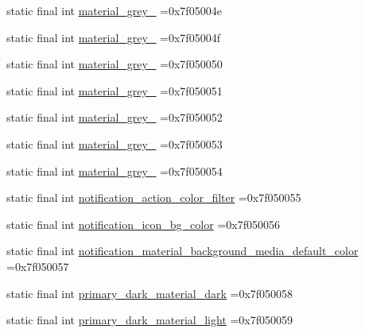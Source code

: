 \begin{DoxyCompactItemize}
\item 
static final int \mbox{\hyperlink{classcom_1_1example_1_1trainawearapplication_1_1_r_1_1color_a6abde947d2c6d3035e498238a10357be}{material\+\_\+grey\+\_}} =0x7f05004e
\item 
static final int \mbox{\hyperlink{classcom_1_1example_1_1trainawearapplication_1_1_r_1_1color_aecbc9b09aff1e2326ca650555af5d29b}{material\+\_\+grey\+\_}} =0x7f05004f
\item 
static final int \mbox{\hyperlink{classcom_1_1example_1_1trainawearapplication_1_1_r_1_1color_a5e2de21ee99dae300ec9238ed7a11b3c}{material\+\_\+grey\+\_}} =0x7f050050
\item 
static final int \mbox{\hyperlink{classcom_1_1example_1_1trainawearapplication_1_1_r_1_1color_a1a1854538eea02421eeb70f2d758b749}{material\+\_\+grey\+\_}} =0x7f050051
\item 
static final int \mbox{\hyperlink{classcom_1_1example_1_1trainawearapplication_1_1_r_1_1color_a653442969c268cdff1da2be14dfd3849}{material\+\_\+grey\+\_}} =0x7f050052
\item 
static final int \mbox{\hyperlink{classcom_1_1example_1_1trainawearapplication_1_1_r_1_1color_aa0bb4acffae66842910f6220d25feacd}{material\+\_\+grey\+\_}} =0x7f050053
\item 
static final int \mbox{\hyperlink{classcom_1_1example_1_1trainawearapplication_1_1_r_1_1color_a19c3c1ef2d0b1afb235e9b4c794b7c25}{material\+\_\+grey\+\_}} =0x7f050054
\item 
static final int \mbox{\hyperlink{classcom_1_1example_1_1trainawearapplication_1_1_r_1_1color_aee8f978ab4be87d8c85b942d4eb7073f}{notification\+\_\+action\+\_\+color\+\_\+filter}} =0x7f050055
\item 
static final int \mbox{\hyperlink{classcom_1_1example_1_1trainawearapplication_1_1_r_1_1color_ad75809dbeaba7294fb0b2bb9bf9b7050}{notification\+\_\+icon\+\_\+bg\+\_\+color}} =0x7f050056
\item 
static final int \mbox{\hyperlink{classcom_1_1example_1_1trainawearapplication_1_1_r_1_1color_a3e8c7fc547b6562d2eb213e9f8a931e8}{notification\+\_\+material\+\_\+background\+\_\+media\+\_\+default\+\_\+color}} =0x7f050057
\item 
static final int \mbox{\hyperlink{classcom_1_1example_1_1trainawearapplication_1_1_r_1_1color_accbb861393aeb28a268d0405184d7e88}{primary\+\_\+dark\+\_\+material\+\_\+dark}} =0x7f050058
\item 
static final int \mbox{\hyperlink{classcom_1_1example_1_1trainawearapplication_1_1_r_1_1color_a06c517b6aec61f6939a3f58a5fc75d6d}{primary\+\_\+dark\+\_\+material\+\_\+light}} =0x7f050059

\end{DoxyCompactItemize}
